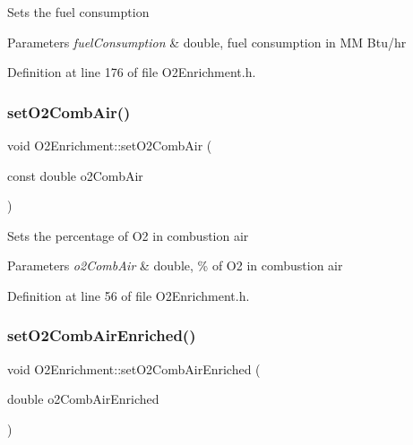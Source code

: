 Sets the fuel consumption 
\begin{DoxyParams}{Parameters}
{\em fuel\+Consumption} & double, fuel consumption in MM Btu/hr \\
\hline
\end{DoxyParams}


Definition at line 176 of file O2\+Enrichment.\+h.

\mbox{\label{class_o2_enrichment_a4ed21239c9e2ed2b193c94e9df0a9079}} 
\subsubsection{\texorpdfstring{set\+O2\+Comb\+Air()}{setO2CombAir()}}
{\footnotesize\ttfamily void O2\+Enrichment\+::set\+O2\+Comb\+Air (\begin{DoxyParamCaption}\item[{const double}]{o2\+Comb\+Air }\end{DoxyParamCaption})\hspace{0.3cm}{\ttfamily [inline]}}

Sets the percentage of O2 in combustion air 
\begin{DoxyParams}{Parameters}
{\em o2\+Comb\+Air} & double, \% of O2 in combustion air \\
\hline
\end{DoxyParams}


Definition at line 56 of file O2\+Enrichment.\+h.

\mbox{\label{class_o2_enrichment_af781223d8201c4e5a1d0085718b0b36c}} 
\subsubsection{\texorpdfstring{set\+O2\+Comb\+Air\+Enriched()}{setO2CombAirEnriched()}}
{\footnotesize\ttfamily void O2\+Enrichment\+::set\+O2\+Comb\+Air\+Enriched (\begin{DoxyParamCaption}\item[{double}]{o2\+Comb\+Air\+Enriched }\end{DoxyParamCaption})\hspace{0.3cm}{\ttfamily [inline]}}

